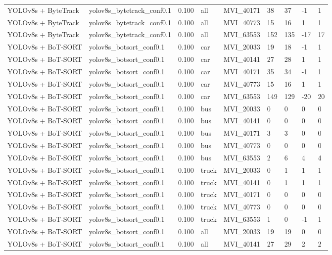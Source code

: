 \begin{tabular}{lllllllll}
YOLOv8s + ByteTrack & yolov8s\_bytetrack\_conf0.1 & 0.100 & all & MVI\_40171 & 38 & 37 & -1 & 1 \\
YOLOv8s + ByteTrack & yolov8s\_bytetrack\_conf0.1 & 0.100 & all & MVI\_40773 & 15 & 16 & 1 & 1 \\
YOLOv8s + ByteTrack & yolov8s\_bytetrack\_conf0.1 & 0.100 & all & MVI\_63553 & 152 & 135 & -17 & 17 \\
YOLOv8s + BoT-SORT & yolov8s\_botsort\_conf0.1 & 0.100 & car & MVI\_20033 & 19 & 18 & -1 & 1 \\
YOLOv8s + BoT-SORT & yolov8s\_botsort\_conf0.1 & 0.100 & car & MVI\_40141 & 27 & 28 & 1 & 1 \\
YOLOv8s + BoT-SORT & yolov8s\_botsort\_conf0.1 & 0.100 & car & MVI\_40171 & 35 & 34 & -1 & 1 \\
YOLOv8s + BoT-SORT & yolov8s\_botsort\_conf0.1 & 0.100 & car & MVI\_40773 & 15 & 16 & 1 & 1 \\
YOLOv8s + BoT-SORT & yolov8s\_botsort\_conf0.1 & 0.100 & car & MVI\_63553 & 149 & 129 & -20 & 20 \\
YOLOv8s + BoT-SORT & yolov8s\_botsort\_conf0.1 & 0.100 & bus & MVI\_20033 & 0 & 0 & 0 & 0 \\
YOLOv8s + BoT-SORT & yolov8s\_botsort\_conf0.1 & 0.100 & bus & MVI\_40141 & 0 & 0 & 0 & 0 \\
YOLOv8s + BoT-SORT & yolov8s\_botsort\_conf0.1 & 0.100 & bus & MVI\_40171 & 3 & 3 & 0 & 0 \\
YOLOv8s + BoT-SORT & yolov8s\_botsort\_conf0.1 & 0.100 & bus & MVI\_40773 & 0 & 0 & 0 & 0 \\
YOLOv8s + BoT-SORT & yolov8s\_botsort\_conf0.1 & 0.100 & bus & MVI\_63553 & 2 & 6 & 4 & 4 \\
YOLOv8s + BoT-SORT & yolov8s\_botsort\_conf0.1 & 0.100 & truck & MVI\_20033 & 0 & 1 & 1 & 1 \\
YOLOv8s + BoT-SORT & yolov8s\_botsort\_conf0.1 & 0.100 & truck & MVI\_40141 & 0 & 1 & 1 & 1 \\
YOLOv8s + BoT-SORT & yolov8s\_botsort\_conf0.1 & 0.100 & truck & MVI\_40171 & 0 & 0 & 0 & 0 \\
YOLOv8s + BoT-SORT & yolov8s\_botsort\_conf0.1 & 0.100 & truck & MVI\_40773 & 0 & 0 & 0 & 0 \\
YOLOv8s + BoT-SORT & yolov8s\_botsort\_conf0.1 & 0.100 & truck & MVI\_63553 & 1 & 0 & -1 & 1 \\
YOLOv8s + BoT-SORT & yolov8s\_botsort\_conf0.1 & 0.100 & all & MVI\_20033 & 19 & 19 & 0 & 0 \\
YOLOv8s + BoT-SORT & yolov8s\_botsort\_conf0.1 & 0.100 & all & MVI\_40141 & 27 & 29 & 2 & 2 \\

\end{tabular}
